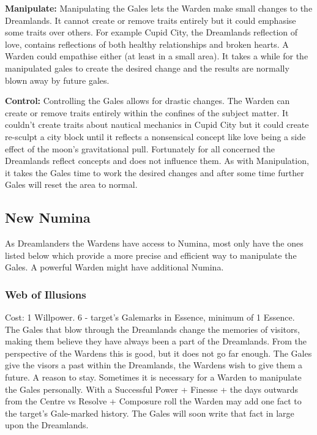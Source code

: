 \noindent \textbf{Manipulate:} Manipulating the Gales lets the Warden make small changes to the Dreamlands. It cannot create or remove traits entirely but it could emphasise some traits over others. For example Cupid City, the Dreamlands reflection of love, contains reflections of both healthy relationships and broken hearts. A Warden could empathise either (at least in a small area). It takes a while for the manipulated gales to create the desired change and the results are normally blown away by future gales. 

\noindent \textbf{Control:} Controlling the Gales allows for drastic changes. The Warden can create or remove traits entirely within the confines of the subject matter. It couldn't create traits about nautical mechanics in Cupid City but it could create re-sculpt a city block until it reflects a nonsensical concept like love being a side effect of the moon's gravitational pull. Fortunately for all concerned the Dreamlands reflect concepts and does not influence them. As with Manipulation, it takes the Gales time to work the desired changes and after some time further Gales will reset the area to normal. 

\subsection*{New Numina}
As Dreamlanders the Wardens have access to Numina, most only have the ones listed below which provide a more precise and efficient way to manipulate the Gales. A powerful Warden might have additional Numina. 

\subsubsection*{Web of Illusions}

Cost: 1 Willpower. 6 - target's Galemarks in Essence, minimum of 1 Essence.\\

\noindent The Gales that blow through the Dreamlands change the memories of visitors, making them believe they have always been a part of the Dreamlands. From the perspective of the Wardens this is good, but it does not go far enough. The Gales give the visors a past within the Dreamlands, the Wardens wish to give them a future. A reason to stay. Sometimes it is necessary for a Warden to manipulate the Gales personally. With a Successful Power + Finesse + the days outwards from the Centre vs Resolve + Composure roll the Warden may add one fact to the target's Gale-marked history. The Gales will soon write that fact in large upon the Dreamlands.

